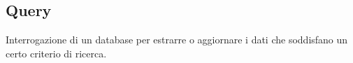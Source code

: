 \documentclass[../glossario.tex]{subfiles}
\begin{document}
\subsection*{Query}
{}
Interrogazione di un database per estrarre o aggiornare i dati che soddisfano un certo criterio di ricerca.

    
\end{document}

